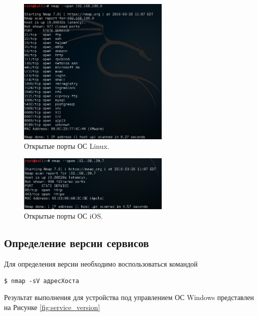 \documentclass[10pt,a4paper]{article}
\begin{document}
\begin{figure}[h]
\begin{center}
\includegraphics[width=0.65\textwidth]{open_ports_linux}
\caption{Открытые порты ОС Linux.}
\label{fig:open_ports_winOS}
\end{center}
\end{figure}

\begin{figure}[h]
\begin{center}
\includegraphics[width=0.65\textwidth]{open_ports_iOS}
\caption{Открытые порты ОС iOS.}
\label{fig:open_ports_iOS}
\end{center}
\end{figure}


\subsection{Определение версии сервисов}
\label{open_ports}

Для определения версии необходимо воспользоваться командой
\begin{verbatim}
$ nmap -sV адресХоста
\end{verbatim}

Результат выполнения для устройства под управлением ОС Windows представлен на Рисунке \ref{fig:service_version}
\end{document}
